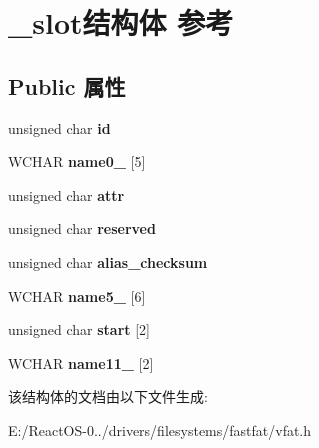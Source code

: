 \hypertarget{struct__slot}{}\section{\+\_\+slot结构体 参考}
\label{struct__slot}
\subsection*{Public 属性}
\begin{DoxyCompactItemize}
\item 
\mbox{\label{struct__slot_a5f2848f15aaf3c9a2fdab763550e4ec2}} 
unsigned char {\bfseries id}
\item 
\mbox{\label{struct__slot_adaaabfc673e60331dbdc8f365e55a3bd}} 
W\+C\+H\+AR {\bfseries name0\+\_} \mbox{[}5\mbox{]}
\item 
\mbox{\label{struct__slot_a92faa5fc5dfba177aa5a620f45eac977}} 
unsigned char {\bfseries attr}
\item 
\mbox{\label{struct__slot_add103c99deb4d70077666502c5f2b488}} 
unsigned char {\bfseries reserved}
\item 
\mbox{\label{struct__slot_a652d1015f3049b331defa23939304095}} 
unsigned char {\bfseries alias\+\_\+checksum}
\item 
\mbox{\label{struct__slot_a58c4ae69cfee3ee5f36f6d76a2c7be6c}} 
W\+C\+H\+AR {\bfseries name5\+\_} \mbox{[}6\mbox{]}
\item 
\mbox{\label{struct__slot_a34de8e489691bf691f8631477881f1cb}} 
unsigned char {\bfseries start} \mbox{[}2\mbox{]}
\item 
\mbox{\label{struct__slot_a256d92a2816940445eda83b5764e9adf}} 
W\+C\+H\+AR {\bfseries name11\+\_} \mbox{[}2\mbox{]}
\end{DoxyCompactItemize}


该结构体的文档由以下文件生成\+:\begin{DoxyCompactItemize}
\item 
E\+:/\+React\+O\+S-\/0../drivers/filesystems/fastfat/vfat.\+h\end{DoxyCompactItemize}
